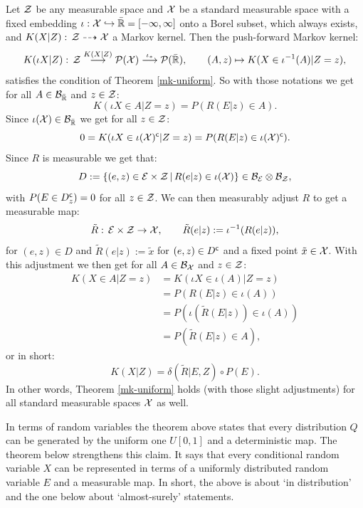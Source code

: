 \begin{Rem}
    \label{rem:R-to-std-ms}
    Let $\mathcal{Z}$ be any measurable space and $\mathcal{X}$ be a standard measurable space with a fixed embedding $\iota: \mathcal{X} \hookrightarrow \bar{\mathbb{R}}=[-\infty,\infty]$ onto a Borel subset, which always exists, and $K(X|Z) :\, \mathcal{Z} \dasharrow \mathcal{X}$ a Markov kernel. Then the push-forward Markov kernel:
    \[K(\iota X|Z) :\, \mathcal{Z} \stackrel{K(X|Z)}{\longrightarrow} \mathcal{P}(\mathcal{X}) \stackrel{\iota_*}{\longrightarrow} \mathcal{P}(\bar{\mathbb{R}}), \qquad (A,z) \mapsto K( X \in \iota^{-1}(A) |Z=z),  \]
    satisfies the condition of Theorem \ref{mk-uniform}. So with those notations we get for all $A \in \mathcal{B}_{\bar{\mathbb{R}}}$ and $z \in \mathcal{Z}$:
\[ K(\iota X \in A|Z=z) = P(R(E|z) \in A).  \]
Since $\iota(\mathcal{X}) \in \mathcal{B}_{\bar {\mathbb{R}}}$ we get for all $z \in \mathcal{Z}$:
\[ 0=K(\iota X \in \iota(\mathcal{X})^{\mathsf{c}}|Z=z) = P(R(E|z) \in \iota(\mathcal{X})^{\mathsf{c}}).  \]
Since $R$ is measurable we get that:
\[ D := \left \{ (e,z) \in \mathcal{E} \times \mathcal{Z} \,\middle|\, R(e|z) \in \iota(\mathcal{X}) \right \} \in \mathcal{B}_{\mathcal{E}} \otimes \mathcal{B}_{\mathcal{Z}},\]
with $P(E \in D_z^{\mathsf{c}}) =0$ for all $z \in \mathcal{Z}$. We can then measurably adjust $R$ to get a measurable map:
\[ \tilde R:\, \mathcal{E} \times \mathcal{Z} \to \mathcal{X}, \qquad \tilde R(e|z) := \iota^{-1}(R(e|z)),\]
for $(e,z) \in D$ and $\tilde R(e|z) := \tilde x$ for $(e,z) \in D^{\mathsf{c}}$ and a fixed point $\tilde x \in \mathcal{X}$.
With this adjustment we then get for all $A \in \mathcal{B}_{\mathcal{X}}$ and $z \in \mathcal{Z}$:
\begin{align*} K(X \in A|Z=z) &= K(\iota X \in \iota(A)|Z=z) \\
&= P( R(E|z) \in \iota(A)) \\
&= P(\iota(\tilde R(E|z)) \in \iota(A)) \\
&= P(\tilde R(E|z) \in A), 
\end{align*}
or in short:
\[ K(X|Z) = \delta(\tilde R|E,Z) \circ P(E).\]
In other words, Theorem \ref{mk-uniform} holds (with those slight adjustments) for all standard measurable spaces $\mathcal{X}$ as well.
\end{Rem}

In terms of random variables the theorem above states that every distribution $Q$ can be generated by the uniform one $U[0,1]$ and a deterministic map. The theorem below strengthens this claim. It says that every conditional random variable $X$ can be represented in terms of a 
uniformly distributed random variable $E$ and a measurable map. In short, the above is about `in distribution' and the one below about `almost-surely' statements.

